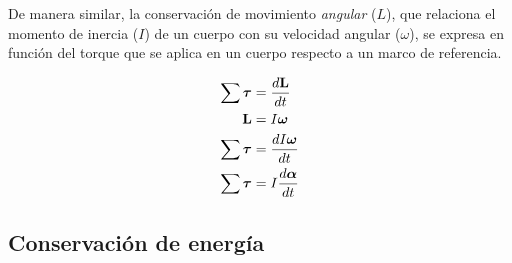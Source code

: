 De manera similar, la conservación de movimiento \emph{angular} ($L$), 
que relaciona el momento de inercia ($I$) de un cuerpo con su 
velocidad angular ($\omega$),
se expresa en función del torque que se aplica en un cuerpo 
respecto a un marco de referencia.

\begin{equation}
 \begin{split}
  \sum \boldsymbol{\tau} &= \dfrac{d \bold{L}}{dt} \\
  \bold{L} & = I \boldsymbol{\omega}\\
  \sum \boldsymbol{\tau} &= \dfrac{d I \boldsymbol{\omega}}{dt} \\
  \sum \boldsymbol{\tau} &= I \dfrac{d \boldsymbol{\alpha}}{dt} 
 \end{split}
 \label{eq: conservation of angular momentum}
\end{equation}


\subsection{Conservación de energía}

